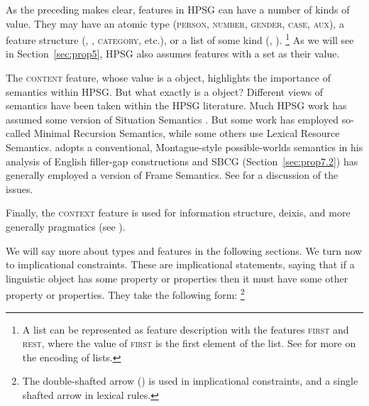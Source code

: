 \documentclass[output=paper
	        ,collection
	        ,collectionchapter
 	        ,biblatex
                ,babelshorthands
                ,newtxmath
                ,draftmode
                ,colorlinks, citecolor=brown
]{langscibook}
\begin{document}
As the preceding makes clear, features in HPSG can have a number of kinds of value. They may have an atomic type (\textsc{person}, \textsc{number}, \textsc{gender}, \textsc{case}, \textsc{aux}), a feature structure (\synsem, \local, \textsc{category}, etc.), or a list of some kind (\subj, \comps).%
%
\footnote{A list can be represented as feature description with the features \textsc{first} and \textsc{rest}, where the value of \textsc{first} is the first element of the list. See \crossrefchapterw[\page \pageref{page-list-encoding}]{formal-background} for more on the encoding of lists.}
%
As we will see in Section~\ref{sec:prop5}, HPSG also assumes features with a set as their value.

The \textsc{content} feature, whose value is a  object, highlights the importance of
semantics within HPSG. But what exactly is a  object? Different views of semantics
have been taken within the HPSG literature. Much HPSG work has assumed some version of Situation
Semantics \citep{BP83a}. But some work has employed so-called Minimal
Recursion Semantics\indexmrs \citep{CFPS2005a}, while some others use Lexical Resource
Semantics\indexlrs \citep{RS2004a-u}. \citet[501]{Sag2010b} adopts a
conventional, Montague-style possible-worlds semantics \citep{Montague74a-ed} in his analysis of English filler-gap constructions and SBCG (Section~\ref{sec:prop7.2}) has generally employed a version of Frame Semantics. See  for a discussion of the issues.

Finally, the \textsc{context} feature is used for information structure, deixis, and more generally pragmatics (see ).

We will say more about types and features in the following sections. We turn now to implicational
constraints. These are implicational statements, saying that if a linguistic object has some property or properties then it must have some other property or properties. They take the following form:%
%
\footnote{The double-shafted arrow (\isi{\impl}) is used in implicational constraints, and a single shafted arrow \isi{$\mapsto$} in lexical rules.}
%
\end{document}
